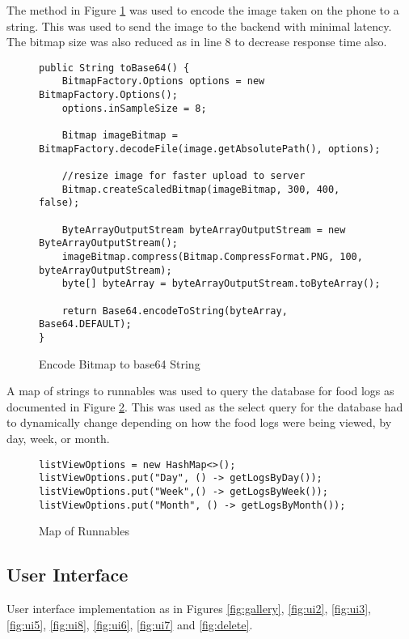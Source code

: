 The method in Figure \ref{lst:encodeBitmap} was used to encode the image taken on the phone to a string.
This was used to send the image to the backend with minimal latency.
The bitmap size was also reduced as in line 8 to decrease response time also.
\begin{figure}[h]
\caption{Encode Bitmap to base64 String}
\label{lst:encodeBitmap}
\begin{lstlisting}[style=Java]
public String toBase64() {
    BitmapFactory.Options options = new BitmapFactory.Options();
    options.inSampleSize = 8;

    Bitmap imageBitmap = BitmapFactory.decodeFile(image.getAbsolutePath(), options);

    //resize image for faster upload to server
    Bitmap.createScaledBitmap(imageBitmap, 300, 400, false);
    
    ByteArrayOutputStream byteArrayOutputStream = new ByteArrayOutputStream();
    imageBitmap.compress(Bitmap.CompressFormat.PNG, 100, byteArrayOutputStream);
    byte[] byteArray = byteArrayOutputStream.toByteArray();

    return Base64.encodeToString(byteArray, Base64.DEFAULT);
}
\end{lstlisting}
\end{figure}

A map of strings to runnables was used to query the database for food logs as documented in Figure \ref{lst:map}.
This was used as the select query for the database had to dynamically change depending on how the food logs were being viewed, by day, week, or month.
\begin{figure}[h]
\caption{Map of Runnables}
\label{lst:map}
\begin{lstlisting}[style=Java]
listViewOptions = new HashMap<>();
listViewOptions.put("Day", () -> getLogsByDay());
listViewOptions.put("Week",() -> getLogsByWeek());
listViewOptions.put("Month", () -> getLogsByMonth());
\end{lstlisting}
\end{figure}

\tocless\subsection{User Interface}
User interface implementation as in Figures \ref{fig:gallery}, \ref{fig:ui2}, \ref{fig:ui3}, \ref{fig:ui5}, \ref{fig:ui8}, \ref{fig:ui6}, \ref{fig:ui7} and \ref{fig:delete}.

